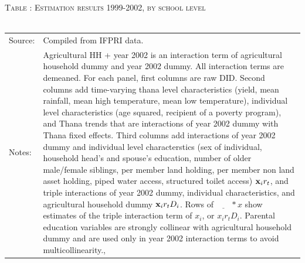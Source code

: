 \documentclass[12pt,letterpaper]{article}
\newcommand{\bfx}{\ensuremath{\mbox{\bf x}}}
\newcommand{\0}{\ensuremath{\mbox{\boldmath $0$}}}
\begin{document}
{\begin{table}\hfil\textsc{\footnotesize Table \thetable: Estimation results 1999-2002, by school level\label{MainGenderAgeGroup2Results}}\\\setlength{\tabcolsep}{.5pt}\renewcommand{\arraystretch}{.675}\hspace{-2em}\hfil\\\renewcommand{\arraystretch}{1}\hfil\begin{tabular}{>{\hfill\scriptsize}p{1cm}<{}>{\scriptsize}p{12cm}<{\hfill}} Source:& Compiled from IFPRI data. \\[-1ex] Notes:&   \textsf{Agricultural HH + year 2002} is an interaction term of agricultural household dummy and year 2002 dummy. All interaction terms are demeaned. For each panel, first columns are raw DID. Second columns add time-varying thana level characteristics (yield, mean rainfall, mean high temperature, mean low temperature), individual level characteristics (age squared, recipient of a poverty program), and \textsf{Thana trends} that are interactions of year 2002 dummy with Thana fixed effects. Third columns add interactions of year 2002 dummy and individual level characterstics (sex of individual, household head's and spouse's education, number of older male/female siblings, per member land holding, per member non land asset holding, piped water access, structured toilet access) $\bfx_{i}r_{t}$, and triple interactions of year 2002 dummy, individual characteristics, and agricultural household dummy $\bfx_{i}r_{t}D_{i}$. Rows of $\underline{\phantom{mm}}*x$ show estimates of the triple interaction term of $x_{i}$, or $x_{i}r_{t}D_{i}$. Parental education variables are strongly collinear with agricultural household dummy and are used only in year 2002 interaction terms to avoid multicollinearity., \\   \end{tabular} \end{table}



}
\end{document}

